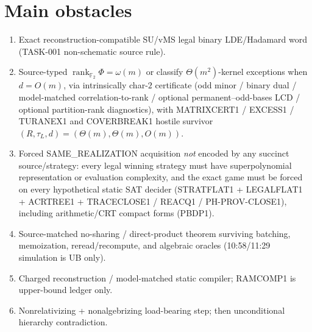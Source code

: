 \documentclass[11pt]{article}
\begin{document}
\section*{Main obstacles}
\begin{enumerate}
\item Exact reconstruction-compatible SU/vMS legal binary LDE/Hadamard word (TASK-001
non-schematic source rule).
\item Source-typed $\operatorname{rank}_{\mathbb F_2}\Phi=\omega(m)$ or classify
$\Theta(m^2)$-kernel exceptions when $d=O(m)$, via intrinsically char-$2$ certificate
(odd minor / binary dual / model-matched correlation-to-rank / optional permanent--odd-bases
LCD / optional partition-rank diagnostics), with MATRIXCERT1 / EXCESS1 / TURANEX1 and
COVERBREAK1 hostile survivor $(R,\tau_L,d)=(\Theta(m),\Theta(m),O(m))$.
\item Forced SAME\_REALIZATION acquisition \emph{not} encoded by any succinct source/strategy:
every legal winning strategy must have superpolynomial representation or evaluation complexity,
and the exact game must be forced on every hypothetical static SAT decider
(STRATFLAT1 + LEGALFLAT1 + ACRTREE1 + TRACECLOSE1 / REACQ1 / PH-PROV-CLOSE1),
including arithmetic/CRT compact forms (PBDP1).
\item Source-matched no-sharing / direct-product theorem surviving batching, memoization,
reread/recompute, and algebraic oracles (10:58/11:29 simulation is UB only).
\item Charged reconstruction / model-matched static compiler; RAMCOMP1 is upper-bound ledger only.
\item Nonrelativizing + nonalgebrizing load-bearing step; then unconditional hierarchy contradiction.
\end{enumerate}
\end{document}
